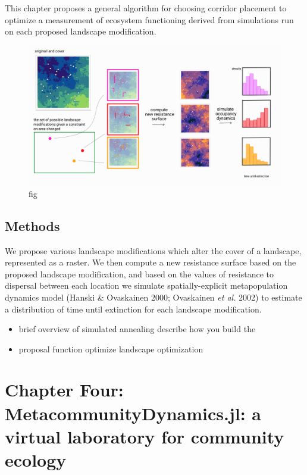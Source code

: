 \documentclass[11pt]{article}
\makeatletter
\def\maxwidth{\ifdim\Gin@nat@width>\linewidth\linewidth
\else\Gin@nat@width\fi}
\let\Oldincludegraphics\includegraphics
\renewcommand{\includegraphics}[1]{\Oldincludegraphics[width=\maxwidth]{#1}}
\makeatother
\begin{document}
This chapter proposes a general algorithm for choosing corridor
placement to optimize a measurement of ecosystem functioning derived
from simulations run on each proposed landscape modification.

\begin{figure}
\hypertarget{fig:ch3}{%
\centering
\includegraphics{./figures/ch3.png}
\caption{fig}\label{fig:ch3}
}
\end{figure}

\hypertarget{methods-1}{%
\subsection{Methods}\label{methods-1}}

We propose various landscape modifications which alter the cover of a
landscape, represented as a raster. We then compute a new resistance
surface based on the proposed landscape modification, and based on the
values of resistance to dispersal between each location we simulate
spatially-explicit metapopulation dynamics model (Hanski \& Ovaskainen
2000; Ovaskainen \emph{et al.} 2002) to estimate a distribution of time
until extinction for each landscape modification.

\begin{itemize}
\tightlist
\item
  brief overview of simulated annealing describe how you build the
\item
  proposal function optimize landscape optimization
\end{itemize}

\hypertarget{chapter-four-metacommunitydynamics.jl-a-virtual-laboratory-for-community-ecology}{%
\section{Chapter Four: MetacommunityDynamics.jl: a virtual laboratory
for community
ecology}\label{chapter-four-metacommunitydynamics.jl-a-virtual-laboratory-for-community-ecology}}
\end{document}
